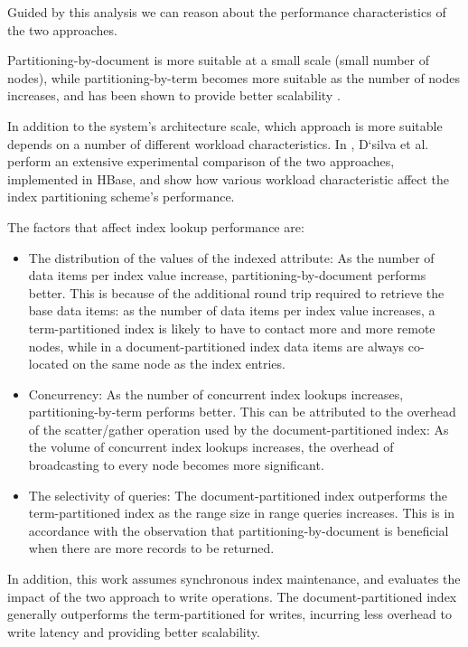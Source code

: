 Guided by this analysis we can reason about the performance characteristics of the two approaches.

Partitioning-by-document is more suitable at a small scale (small number of nodes),
while partitioning-by-term becomes more suitable as the number of nodes increases,
and has been shown to provide better scalability \cite{kejriwal:slik}.

In addition to the system's architecture scale,
which approach is more suitable depends on a number of different workload characteristics.
In \cite{dsilva:tworings}, D`silva et al. perform an extensive experimental comparison of the two approaches,
implemented in HBase, and show how various workload characteristic affect the index partitioning scheme's performance.

The factors that affect index lookup performance are:
\begin{itemize}

  \item The distribution of the values of the indexed attribute:
  As the number of data items per index value increase, partitioning-by-document performs better.
  This is because of the additional round trip required to retrieve the base data items:
  as the number of data items per index value increases, a term-partitioned index is likely to have to contact
  more and more remote nodes, while in a document-partitioned index data items are always co-located on the same node as
  the index entries.

  \item Concurrency:
  As the number of concurrent index lookups increases, partitioning-by-term performs better.
  This can be attributed to the overhead of the scatter/gather operation used by the document-partitioned index:
  As the volume of concurrent index lookups increases,
  the overhead of broadcasting to every node becomes more significant.

  \item The selectivity of queries:
  The document-partitioned index outperforms the term-partitioned index as the range size in range queries increases.
  This is in accordance with the observation that partitioning-by-document is beneficial when there are
  more records to be returned.

\end{itemize}

In addition, this work assumes synchronous index maintenance, and evaluates the impact of the two approach to write
operations.
The document-partitioned index generally outperforms the term-partitioned for writes,
incurring less overhead to write latency and providing better scalability.


